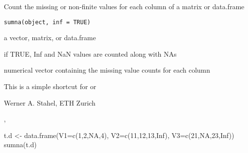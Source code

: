 \documentclass{article}
\begin{document}
\begin{Description}\relax
Count the missing or non-finite values for each column of a matrix or
data.frame
\end{Description}
\begin{Usage}
\begin{verbatim}
sumna(object, inf = TRUE)
\end{verbatim}
\end{Usage}
\begin{Arguments}
\begin{ldescription}
\item[\code{object}] a vector, matrix, or data.frame
\item[\code{inf}] if TRUE, Inf and NaN values are counted along with NAs
\end{ldescription}
\end{Arguments}
\begin{Value}
numerical vector containing the missing value counts for each column
\end{Value}
\begin{Note}\relax
This is a simple shortcut for 
or 
\end{Note}
\begin{Author}\relax
Werner A. Stahel, ETH Zurich
\end{Author}
\begin{SeeAlso}\relax
{}, 
\end{SeeAlso}
\begin{Examples}
\begin{ExampleCode}
t.d <- data.frame(V1=c(1,2,NA,4), V2=c(11,12,13,Inf), V3=c(21,NA,23,Inf))
sumna(t.d)
\end{ExampleCode}
\end{Examples}
\end{document}
